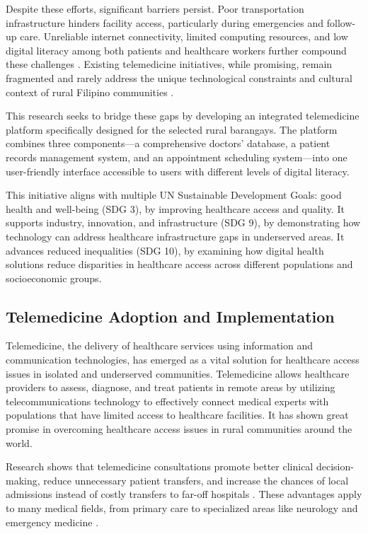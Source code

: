 \documentclass{research}
\begin{document}
Despite these efforts, significant barriers persist. Poor transportation infrastructure hinders
facility access, particularly during emergencies and follow-up care. Unreliable internet
connectivity, limited computing resources, and low digital literacy among both patients and
healthcare workers further compound these challenges \cite{Abdul2024,Castillo2023}. Existing
telemedicine initiatives, while promising, remain fragmented and rarely address the unique
technological constraints and cultural context of rural Filipino communities
\cite{Domingo2023,Cruz2022}.

This research seeks to bridge these gaps by developing an integrated telemedicine platform
specifically designed for the selected rural barangays. The platform combines three components—a
comprehensive doctors' database, a patient records management system, and an appointment
scheduling system—into one user-friendly interface accessible to users with different levels of
digital literacy.

This initiative aligns with multiple UN Sustainable Development Goals: good health and well-being
(SDG 3), by improving healthcare access and quality. It supports industry, innovation, and
infrastructure (SDG 9), by demonstrating how technology can address healthcare infrastructure gaps
in underserved areas. It advances reduced inequalities (SDG 10), by examining how digital health
solutions reduce disparities in healthcare access across different populations and socioeconomic
groups.

\subsection*{Telemedicine Adoption and Implementation}

Telemedicine, the delivery of healthcare services using information and communication
technologies, has emerged as a vital solution for healthcare access issues in isolated and
underserved communities. Telemedicine allows healthcare providers to assess, diagnose, and treat
patients in remote areas by utilizing telecommunications technology to effectively connect medical
experts with populations that have limited access to healthcare facilities. It has shown great
promise in overcoming healthcare access issues in rural communities around the world.

Research shows that telemedicine consultations promote better clinical decision-making, reduce
unnecessary patient transfers, and increase the chances of local admissions instead of costly
transfers to far-off hospitals \cite{Natafgi2021,McCormick2021}. These advantages apply to many
medical fields, from primary care to specialized areas like neurology and emergency medicine
\cite{Ezeamii2024}.
\end{document}
